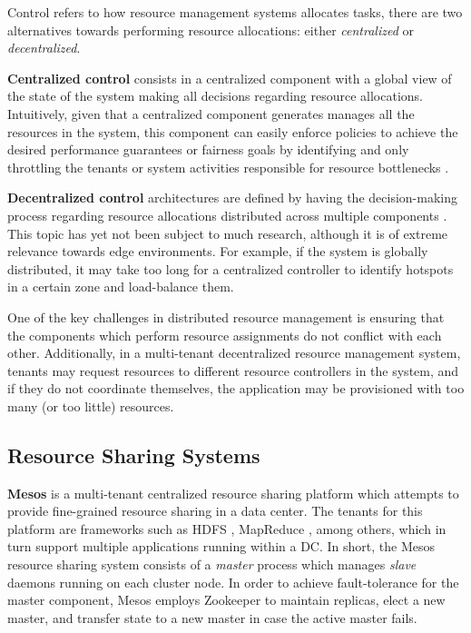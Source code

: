Control refers to how resource management systems allocates tasks, there are two alternatives towards performing resource allocations: either \textit{centralized} or \textit{decentralized}.

\textbf{Centralized control} consists in a centralized component with a global view of the state of the system making all decisions regarding resource allocations. Intuitively, given that a centralized component generates manages all the resources in the system, this component can easily enforce policies to achieve the desired performance guarantees or fairness goals by identifying and only throttling the tenants or system activities responsible for resource bottlenecks \cite{verma2015large}.

\textbf{Decentralized control} architectures are defined by having the decision-making process regarding resource allocations distributed across multiple components \cite{Hong2019}. This topic has yet not been subject to much research, although it is of extreme relevance towards edge environments. For example, if the system is globally distributed, it may take too long for a centralized controller to identify hotspots in a certain zone and load-balance them.

One of the key challenges in distributed resource management is ensuring that the components which perform resource assignments do not conflict with each other. Additionally, in a multi-tenant decentralized resource management system, tenants may request resources to different resource controllers in the system, and if they do not coordinate themselves, the application may be provisioned with too many (or too little) resources.

\subsection{Resource Sharing Systems}

\textbf{Mesos} \cite{hindman2011mesos} is a multi-tenant centralized resource sharing platform which attempts to provide fine-grained resource sharing in a data center. The tenants for this platform are frameworks such as HDFS \cite{borthakur2008hdfs}, MapReduce \cite{dean2008mapreduce}, among others, which in turn support multiple applications running within a DC. In short, the Mesos resource sharing system consists of a \textit{master} process which manages \textit{slave} daemons running on each cluster node. In order to achieve fault-tolerance for the master component, Mesos employs Zookeeper \cite{hunt2010zookeeper} to maintain replicas, elect a new master, and transfer state to a new master in case the active master fails.

